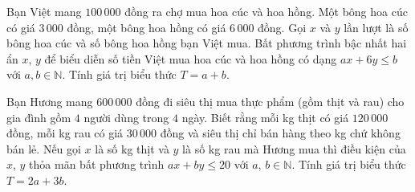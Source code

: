 
\begin{bt}%
	Bạn Việt mang $100\,000$ đồng ra chợ mua hoa cúc và hoa hồng. Một bông hoa cúc có giá $3\,000$ đồng, một bông hoa hồng có giá $6\,000$ đồng. Gọi $x$ và $y$ lần lượt là số bông hoa cúc và số bông hoa hồng  bạn Việt mua. Bất phương trình bậc nhất hai ẩn $x$, $y$ để biểu diễn số tiền Việt mua hoa cúc và hoa hồng có dạng $ax + 6y \leq b$ với $a, b \in \mathbb{N}$. Tính giá trị biểu thức $T = a + b$.
\end{bt}

\begin{bt}%
	Bạn Hương mang $600\,000 $ đồng đi siêu thị mua thực phẩm (gồm thịt và rau) cho gia đình gồm $4$ người dùng trong $4$ ngày. Biết rằng mỗi kg thịt có giá $120\,000$ đồng, mỗi kg rau có giá $30\, 000$ đồng và siêu  thị chỉ bán hàng theo kg chứ không bán lẻ. Nếu gọi $x$ là số kg thịt và $y$ là số kg rau mà Hương mua thì điều kiện của $x$, $y$ thỏa mãn bất phương trình $ax + by \le 20$ với $a$, $b \in \mathbb{N}$.
	Tính giá trị biểu thức $T = 2a +  3b$.
\end{bt}

